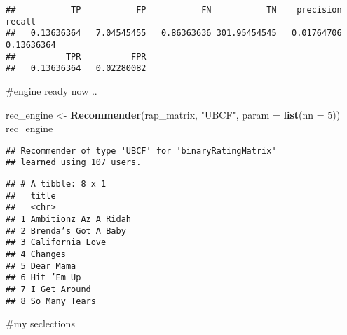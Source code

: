 \documentclass[
]{article}
\newenvironment{Shaded}{\begin{snugshade}}{\end{snugshade}}
\newcommand{\DataTypeTok}[1]{\textcolor[rgb]{0.13,0.29,0.53}{#1}}
\newcommand{\DecValTok}[1]{\textcolor[rgb]{0.00,0.00,0.81}{#1}}
\newcommand{\KeywordTok}[1]{\textcolor[rgb]{0.13,0.29,0.53}{\textbf{#1}}}
\newcommand{\NormalTok}[1]{#1}
\newcommand{\OperatorTok}[1]{\textcolor[rgb]{0.81,0.36,0.00}{\textbf{#1}}}
\newcommand{\StringTok}[1]{\textcolor[rgb]{0.31,0.60,0.02}{#1}}
\begin{document}
\begin{verbatim}
##           TP           FP           FN           TN    precision       recall 
##   0.13636364   7.04545455   0.86363636 301.95454545   0.01764706   0.13636364 
##          TPR          FPR 
##   0.13636364   0.02280082
\end{verbatim}

\#engine ready now ..

\begin{Shaded}
\begin{Highlighting}[]
\NormalTok{rec_engine <-}\StringTok{ }\KeywordTok{Recommender}\NormalTok{(rap_matrix, }\StringTok{"UBCF"}\NormalTok{, }\DataTypeTok{param =} \KeywordTok{list}\NormalTok{(}\DataTypeTok{nn =} \DecValTok{5}\NormalTok{))}
\NormalTok{rec_engine}
\end{Highlighting}
\end{Shaded}

\begin{verbatim}
## Recommender of type 'UBCF' for 'binaryRatingMatrix' 
## learned using 107 users.
\end{verbatim}

\begin{Shaded}
\end{Shaded}

\begin{verbatim}
## # A tibble: 8 x 1
##   title               
##   <chr>               
## 1 Ambitionz Az A Ridah
## 2 Brenda’s Got A Baby 
## 3 California Love     
## 4 Changes             
## 5 Dear Mama           
## 6 Hit ’Em Up          
## 7 I Get Around        
## 8 So Many Tears
\end{verbatim}

\#my seclections
\end{document}
